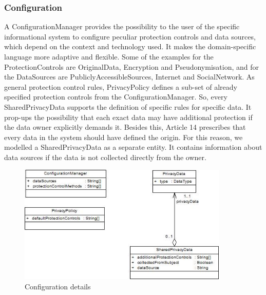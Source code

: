 \documentclass[11pt,english]{article}
\begin{document}
\subsubsection{Configuration}
A ConfigurationManager provides the possibility to the user of the specific informational system to configure peculiar protection controls and data sources, 
which depend on the context and technology used. It makes the domain-specific language more adaptive and flexible. Some of the examples for the ProtectionControls are OriginalData, Encryption and Pseudonymisation, and for the DataSources are PubliclyAccessibleSources, Internet and SocialNetwork. As general protection control rules, PrivacyPolicy defines a sub-set of already specified protection controls from the ConfigurationManager. So, every SharedPrivacyData supports the definition of specific rules for specific data. It prop-ups the possibility that each exact data may have additional protection if the data owner explicitly demands it. Besides this, Article 14 prescribes that every data in the system should have defined the origin. For this reason, we modelled a SharedPrivacyData as a separate entity. It contains information about data sources if the data is not collected directly from the owner.
\begin{figure}[H]
    \centering
    \includegraphics[width=10cm,scale=0.5]{images/configuration.jpg}
    \caption{Configuration details}
    \label{fig:configuration}
\end{figure}
\end{document}

